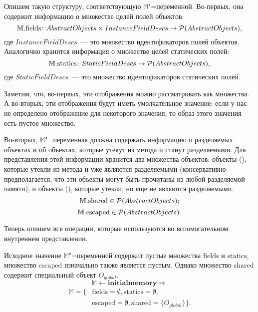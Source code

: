 \documentclass[14pt,titlepage,draft]{extarticle}
\newcommand{\M}{\ensuremath{\mathbb{M}}}
\newcommand{\Mfield}[1]{\ensuremath{\mathrm{#1}}}
\newcommand{\op}[1]{\mathbf{#1}}
\begin{document}
      Опишем такую структуру, соответствующую \M"=переменной. Во-первых, она
      содержит информацию о множестве целей полей объектов:
      \[ \M.\Mfield{fields}\colon
        AbstractObjects \times InstanceFieldDescs \to
        \powerset{AbstractObjects},
      \]
      где $InstanceFieldDescs$~--- это множество идентификаторов полей
      объектов.  Аналогично хранится информация о множестве целей статических
      полей:
      \[ \M.\Mfield{statics}\colon
        StaticFieldDescs \to \powerset{AbstractObjects},
      \]
      где $StaticFieldDescs$~--- это множество идентификаторов
      статических полей.

      Заметим, что, во-первых, эти отображения можно рассматривать как
      множества.  А во-вторых, эти отображения будут иметь умолчательное
      значение: если у нас не определено отображение для некоторого значения,
      то образ этого значения есть пустое множество.

      Во-вторых, \M"=переменная должна содержать информацию о разделяемых
      объектах и об объектах, которые утекут  из метода и станут
      разделяемыми. Для представления этой информации хранится два множества
      объектов: объекты (), которые утекли из метода и уже являются
      разделяемыми (консервативно предполагается, что эти объекты могут быть
      прочитаны из любой разделяемой памяти), и объекты (),
      которые утекли, но еще не являются разделяемыми.
      \[ \M.\Mfield{shared} \in \powerset{AbstractObjects}; \]
      \[ \M.\Mfield{escaped} \in \powerset{AbstractObjects}. \]

      Теперь опишем все операции, которые используются во вспомогательном
      внутреннем представлении.

      Исходное значение \M"=переменной  содержит пустые множества
      \Mfield{fields} и \Mfield{statics}, множество \Mfield{escaped} изначально
      также является пустым. Однако множество \Mfield{shared} содержит
      специальный объект
      $O_{global}$.
      \[\M \gets \op{initialmemory }\Rightarrow \]
      \[\begin{split}
        \M = \{ &\Mfield{fields} = \emptyset, \Mfield{statics} = \emptyset, \\
        &\Mfield{escaped} = \emptyset,
        \Mfield{shared} = \{O_{global}\}
      \}.
      \end{split}\]
\end{document}
